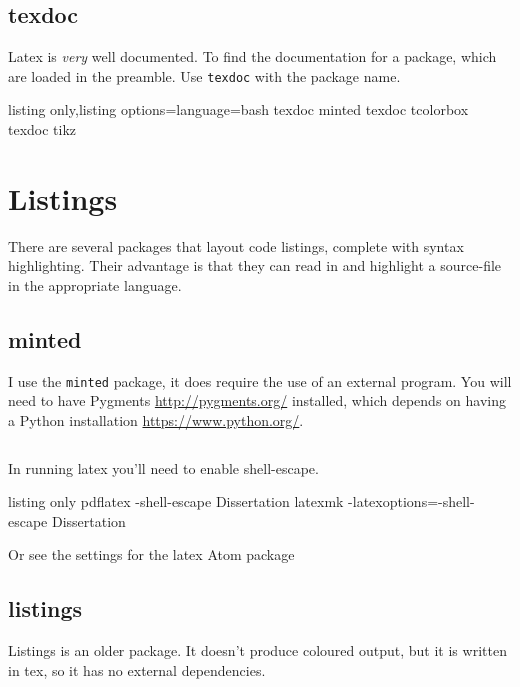 \subsection{texdoc}\label{tex:texdoc}
Latex is \emph{very} well documented.  To find the documentation for a package, which are loaded in the preamble.  Use \texttt{texdoc} with the package name.
\begin{tcblisting}{listing only,listing options={language=bash}}
    texdoc minted
    texdoc tcolorbox
    texdoc tikz
\end{tcblisting}

\section{Listings}
There are several packages that layout code listings, complete with syntax highlighting.  Their advantage is that they can read in and highlight a source-file in the appropriate language.


\subsection{minted}
I use the \texttt{minted} package,  it does require the use of an external program.  You will need to have Pygments \url{http://pygments.org/} installed, which depends on having a Python installation \url{https://www.python.org/}.

\begin{tcblisting}{}
\inputminted{c}{hello.c}
\end{tcblisting}

In running latex you'll need to enable shell-escape.
\begin{tcblisting}{listing only}
pdflatex -shell-escape Dissertation
latexmk -latexoptions=-shell-escape Dissertation
\end{tcblisting}
Or see the settings for the latex Atom package

\subsection{listings}
Listings is an older package.  It doesn't produce coloured output, but it is written in tex, so it has no external dependencies.
\begin{tcblisting}{}
\lstset{language=c}

\end{tcblisting}
